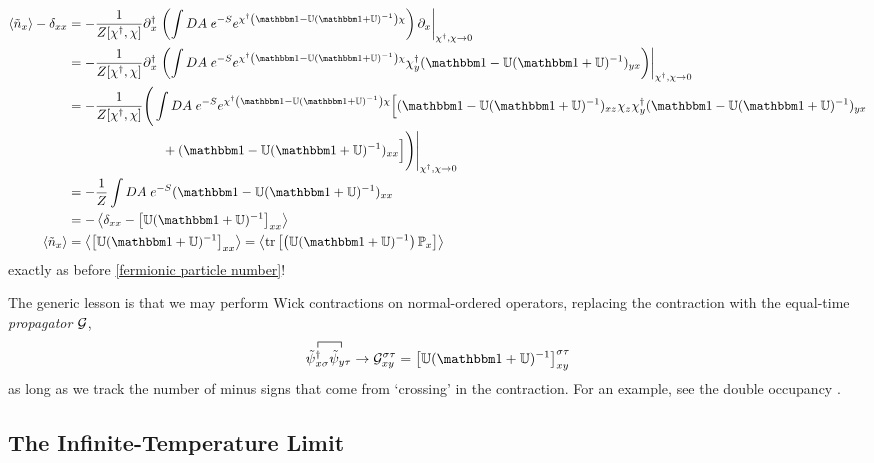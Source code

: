 \begin{align}
	\expectation{\tilde{n}_x} - \delta_{xx}
	&=
	- \oneover{Z[\chi\adjoint, \chi]} \partial\adjoint_x \left. \left(
		\int DA\; e^{-S } e^{ \chi\adjoint \left(\one - \UU (\one+\UU)\inverse\right)\chi }
	\right) \partial_x \right|_{\chi\adjoint, \chi\goesto0}
	\nonumber\\
	&=
	- \oneover{Z[\chi\adjoint, \chi]} \partial\adjoint_x \left.\left(
		\int DA\; e^{-S } e^{ \chi\adjoint \left(\one - \UU (\one+\UU)\inverse\right)\chi }
		\chi\adjoint_y (\one - \UU (\one+\UU)\inverse)_{yx}
	\right) \right|_{\chi\adjoint, \chi\goesto0}
	\nonumber\\
	&=
	- \oneover{Z[\chi\adjoint, \chi]} \Bigg(
		\int DA\; e^{-S } e^{ \chi\adjoint \left(\one - \UU (\one+\UU)\inverse\right)\chi }
		\Big[
			(\one - \UU(\one+\UU)\inverse)_{xz} \chi_z \chi\adjoint_y (\one - \UU (\one+\UU)\inverse)_{yx}
			\nonumber\\
			&\hspace{1in}
			+ (\one - \UU (\one+\UU)\inverse)_{xx}
		\Big]
	\Bigg) \Bigg|_{\chi\adjoint, \chi\goesto0}
	\nonumber\\
	&=
	- \oneover{Z} \int DA\; e^{-S }
		(\one - \UU (\one+\UU)\inverse)_{xx}
	\nonumber\\
	&=
	-\expectation{ \delta_{xx} - \left[\UU (\one+\UU)\inverse\right]_{xx}}
	\nonumber\\
	\expectation{\tilde{n}_x} &= \expectation{ \left[\UU (\one+\UU)\inverse\right]_{xx}} = \expectation{ \tr{ \left(\UU (\one+\UU)\inverse\right) \PP_x }}
\end{align}
exactly as before \eqref{fermionic particle number}!

The generic lesson is that we may perform Wick contractions on normal-ordered operators, replacing the contraction with the equal-time \emph{propagator} $\mathcal{G}$,
\begin{align}
	\contraction{}{\tilde{\psi}\adjoint_{x\sigma}}{}{\tilde{\psi}_{y\tau}}
	\tilde{\psi}\adjoint_{x\sigma}\tilde{\psi}_{y\tau}
	\goesto
	\G^{\sigma\tau}_{xy} = \left[\UU (\one+\UU)\inverse\right]_{xy}^{\sigma\tau}
	\label{eq:propagator}
\end{align}
as long as we track the number of minus signs that come from `crossing' in the contraction.
For an example, see the double occupancy .

\subsection{The Infinite-Temperature Limit}\label{sec:infinite temperature}

